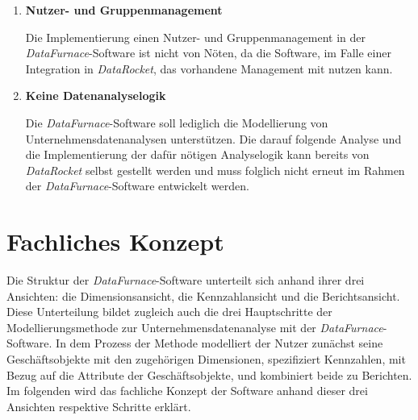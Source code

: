 \documentclass[
  language=german, %
  type=bachelor%
]{isthesis}
\begin{document}
\begin{content}
  \begin{enumerate}
    \item \textbf{Nutzer- und Gruppenmanagement}

		Die Implementierung einen Nutzer- und Gruppenmanagement in der
		\textit{DataFurnace}-Software ist nicht von Nöten, da die Software, im
		Falle einer Integration in \textit{DataRocket}, das vorhandene Management
		mit nutzen kann.

    \item \textbf{Keine Datenanalyselogik}

			Die \textit{DataFurnace}-Software soll lediglich die Modellierung von
			Unternehmensdatenanalysen unterstützen. Die darauf folgende Analyse und
			die Implementierung der dafür nötigen Analyselogik kann bereits von \textit{DataRocket}
			selbst gestellt werden und muss folglich nicht erneut im Rahmen der
			\textit{DataFurnace}-Software entwickelt werden.
  \end{enumerate}



  \section{Fachliches Konzept}

  Die Struktur der \textit{DataFurnace}-Software unterteilt sich anhand ihrer
  drei Ansichten: die Dimensionsansicht, die Kennzahlansicht und die
  Berichtsansicht. Diese Unterteilung bildet zugleich auch die drei
  Hauptschritte der Modellierungsmethode zur Unternehmensdatenanalyse mit der
  \textit{DataFurnace}-Software. In dem Prozess der Methode modelliert der
  Nutzer zunächst seine Geschäftsobjekte mit den zugehörigen Dimensionen,
  spezifiziert Kennzahlen, mit Bezug auf die Attribute der Geschäftsobjekte,
  und kombiniert beide zu Berichten. Im folgenden wird das fachliche Konzept
  der Software anhand dieser drei Ansichten respektive Schritte erklärt. 


\end{content}
\end{document}
